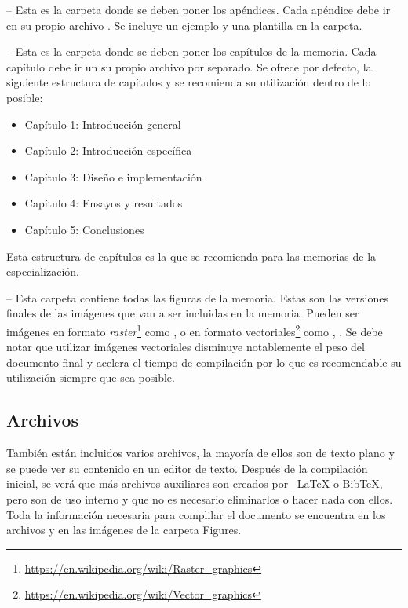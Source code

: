  -- Esta es la carpeta donde se deben poner los apéndices. Cada apéndice debe ir en su propio archivo . Se incluye un ejemplo y una plantilla en la carpeta.

 -- Esta es la carpeta donde se deben poner los capítulos de la memoria. Cada capítulo debe ir un su propio archivo  por separado.  Se ofrece por defecto, la siguiente estructura de capítulos y se recomienda su utilización dentro de lo posible:

\begin{itemize}
\item Capítulo 1: Introducción general	
\item Capítulo 2: Introducción específica
\item Capítulo 3: Diseño e implementación
\item Capítulo 4: Ensayos y resultados
\item Capítulo 5: Conclusiones

\end{itemize}

Esta estructura de capítulos es la que se recomienda para las memorias de la especialización.

 -- Esta carpeta contiene todas las figuras de la memoria.  Estas son las versiones finales de las imágenes que van a ser incluidas en la memoria.  Pueden ser imágenes en formato \textit{raster}\footnote{\url{https://en.wikipedia.org/wiki/Raster_graphics}} como ,  o en formato vectoriales\footnote{\url{https://en.wikipedia.org/wiki/Vector_graphics}} como , .  Se debe notar que utilizar imágenes vectoriales disminuye notablemente el peso del documento final y acelera el tiempo de compilación por lo que es recomendable su utilización siempre que sea posible.

\subsection{Archivos}

También están incluidos varios archivos, la mayoría de ellos son de texto plano y se puede ver su contenido en un editor de texto. Después de la compilación inicial, se verá que más archivos auxiliares son creados por \ LaTeX{} o BibTeX, pero son de uso interno y que no es necesario eliminarlos o hacer nada con ellos.  Toda la información necesaria para complilar el documento se encuentra en los archivos  y en las imágenes de la carpeta Figures.

